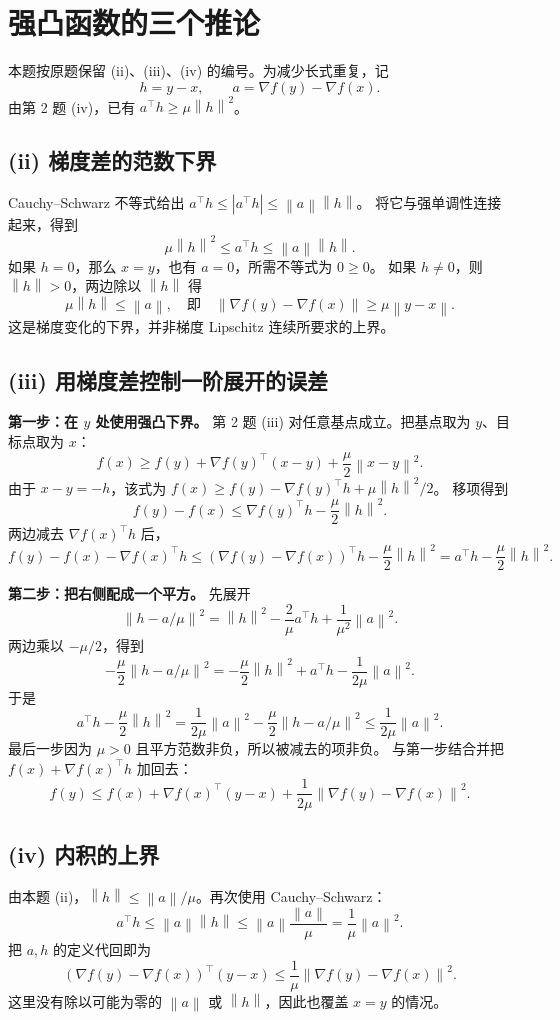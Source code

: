 \documentclass[UTF8,a4paper,11pt,fontset=fandol]{ctexart}
\newcommand{\norm}[1]{\left\lVert#1\right\rVert}
\begin{document}
\section{强凸函数的三个推论}
本题按原题保留 (ii)、(iii)、(iv) 的编号。为减少长式重复，记
\[
 h=y-x,\qquad a=\nabla f(y)-\nabla f(x).
\]
由第 2 题 (iv)，已有 $a^\top h\geq\mu\norm h^2$。

\subsection*{(ii) 梯度差的范数下界}
Cauchy--Schwarz 不等式给出
$a^\top h\leq|a^\top h|\leq\norm a\norm h$。
将它与强单调性连接起来，得到
\[
 \mu\norm h^2\leq a^\top h\leq\norm a\norm h.
\]
如果 $h=0$，那么 $x=y$，也有 $a=0$，所需不等式为 $0\geq0$。
如果 $h\ne0$，则 $\norm h>0$，两边除以 $\norm h$ 得
\[
 \mu\norm h\leq\norm a,
 \quad\text{即}\quad
 \boxed{\norm{\nabla f(y)-\nabla f(x)}\geq\mu\norm{y-x}.}
\]
这是梯度变化的下界，并非梯度 Lipschitz 连续所要求的上界。

\subsection*{(iii) 用梯度差控制一阶展开的误差}
\textbf{第一步：在 $y$ 处使用强凸下界。}
第 2 题 (iii) 对任意基点成立。把基点取为 $y$、目标点取为 $x$：
\[
 f(x)\geq f(y)+\nabla f(y)^\top(x-y)+\frac\mu2\norm{x-y}^2.
\]
由于 $x-y=-h$，该式为
$f(x)\geq f(y)-\nabla f(y)^\top h+\mu\norm h^2/2$。
移项得到
\[
 f(y)-f(x)\leq\nabla f(y)^\top h-\frac\mu2\norm h^2.
\]
两边减去 $\nabla f(x)^\top h$ 后，
\[
 f(y)-f(x)-\nabla f(x)^\top h
 \leq(\nabla f(y)-\nabla f(x))^\top h-\frac\mu2\norm h^2
 =a^\top h-\frac\mu2\norm h^2.
\]

\textbf{第二步：把右侧配成一个平方。}
先展开
\[
 \norm{h-a/\mu}^2
 =\norm h^2-\frac2\mu a^\top h+\frac1{\mu^2}\norm a^2.
\]
两边乘以 $-\mu/2$，得到
\[
 -\frac\mu2\norm{h-a/\mu}^2
 =-\frac\mu2\norm h^2+a^\top h-\frac1{2\mu}\norm a^2.
\]
于是
\[
 a^\top h-\frac\mu2\norm h^2
 =\frac1{2\mu}\norm a^2-\frac\mu2\norm{h-a/\mu}^2
 \leq\frac1{2\mu}\norm a^2.
\]
最后一步因为 $\mu>0$ 且平方范数非负，所以被减去的项非负。
与第一步结合并把 $f(x)+\nabla f(x)^\top h$ 加回去：
\[
 \boxed{f(y)\leq f(x)+\nabla f(x)^\top(y-x)
 +\frac1{2\mu}\norm{\nabla f(y)-\nabla f(x)}^2.}
\]

\subsection*{(iv) 内积的上界}
由本题 (ii)，$\norm h\leq\norm a/\mu$。再次使用 Cauchy--Schwarz：
\[
 a^\top h\leq\norm a\norm h
 \leq\norm a\frac{\norm a}{\mu}
 =\frac1\mu\norm a^2.
\]
把 $a,h$ 的定义代回即为
\[
 \boxed{(\nabla f(y)-\nabla f(x))^\top(y-x)
 \leq\frac1\mu\norm{\nabla f(y)-\nabla f(x)}^2.}
\]
这里没有除以可能为零的 $\norm a$ 或 $\norm h$，因此也覆盖 $x=y$ 的情况。
\end{document}
